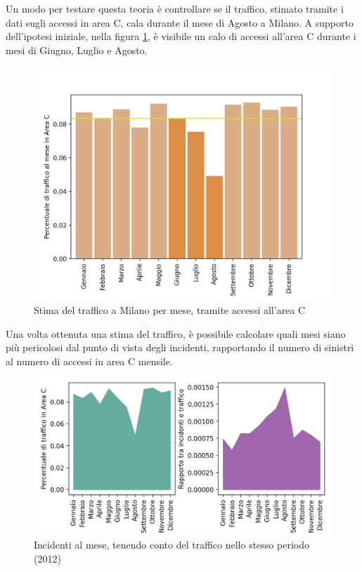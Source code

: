 \documentclass[a4paper,12pt]{report}
\begin{document}
Un modo per testare questa teoria è controllare se il traffico, 
stimato tramite i dati sugli accessi in area C, cala durante il mese di 
Agosto a Milano. 
A supporto dell'ipotesi iniziale, nella figura \ref{fig:stima-traffico-mensile}, 
è visibile un calo di accessi all'area C durante i mesi di Giugno, Luglio e Agosto.

\begin{figure}
    \hfill\includegraphics[width=0.7\linewidth]{../src/area_c/stima_traffico_mese.png}\hspace*{\fill}
    \caption{Stima del traffico a Milano per mese, tramite accessi all'area C}
    \label{fig:stima-traffico-mensile}
\end{figure}

Una volta ottenuta una stima del traffico, è possibile calcolare quali mesi 
siano più pericolosi dal punto di vista degli incidenti, rapportando il numero di 
sinistri al numero di accessi in area C mensile.

\begin{figure}
    \includegraphics[width=\linewidth]{../src/area_c/rapporto_mese.png}
    \caption{Incidenti al mese, tenendo conto del traffico nello stesso periodo (2012)}
    \label{fig:incidenti-traffico-mese}
\end{figure}
\end{document}

